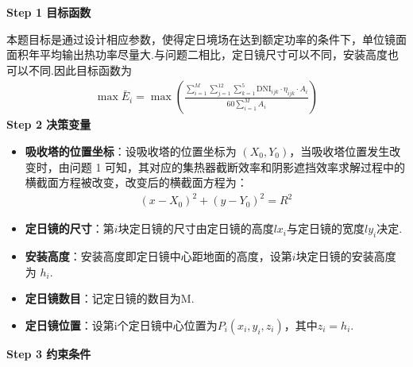 \documentclass[../main.tex]{subfiles}
\begin{document}
 \noindent \textbf{Step 1 目标函数}
  \par 本题目标是通过设计相应参数，使得定日境场在达到额定功率的条件下，单位镜面面积年平均输出热功率尽量大.与问题二相比，定日镜尺寸可以不同，安装高度也可以不同.因此目标函数为
  \begin{align}\label{2.1}
    \max \bar{E}_i = \max\left(\frac{\sum_{i=1}^{M} \sum_{j=1}^{12} \sum_{k=1}^{5} \text{DNI}_{ijk} \cdot \eta_{ijk} \cdot A_i}{60 \sum_{i=1}^{M} A_i}\right)
  \end{align}
  \noindent \textbf{Step 2 决策变量}
   \begin{itemize}
  \item \textbf{吸收塔的位置坐标}：设吸收塔的位置坐标为 \((X_0, Y_0)\)，当吸收塔位置发生改变时，由问题 1 可知，其对应的集热器截断效率和阴影遮挡效率求解过程中的横截面方程被改变，改变后的横截面方程为：
  \begin{align}\label{2.2}
    (x - X_0)^2 + (y - Y_0)^2 = R^2
  \end{align}
  \item \textbf{定日镜的尺寸}：第$i$块定日镜的尺寸由定日镜的高度\(lx_i\)与定日镜的宽度\(ly_i\)决定.
  \item \textbf{安装高度}：安装高度即定日镜中心距地面的高度，设第$i$块定日镜的安装高度为 \(h_i\).
  \item \textbf{定日镜数目}：记定日镜的数目为M.
  \item \textbf{定日镜位置}：设第i个定日镜中心位置为$P_{i}(x_i,y_i,z_i)$，其中$z_i=h_i$.
  \end{itemize}
\noindent \textbf{Step 3 约束条件}
\end{document}
